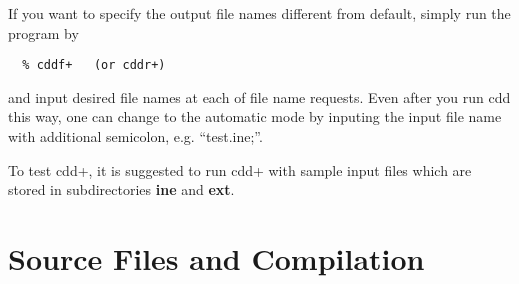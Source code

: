 \documentclass[11pt]{article}
\begin{document}
\bigskip  \noindent
If you want to specify the output file names
different from default, simply run the program by
\begin{verbatim}
  % cddf+   (or cddr+)
\end{verbatim}
and input desired file names at each of file name requests.
Even after you run cdd this way, one can 
change to the automatic mode by inputing the input file 
name with additional semicolon, e.g. ``test.ine;''.

To test cdd+, it is suggested to run cdd+ with sample input files
which are stored in subdirectories {\bf ine} and {\bf ext}.

\section{Source Files and Compilation}  \label{CAUTIONS}
\end{document}
